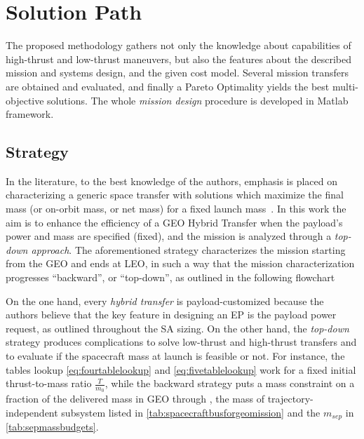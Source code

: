 
\section{Solution Path}
\label{sec:solutionpath}
The proposed methodology gathers not only the knowledge about capabilities of high-thrust and low-thrust maneuvers, but also the features about the described mission and systems design, and the given cost model.
Several mission transfers are obtained and evaluated, and finally a Pareto Optimality yields the best multi-objective solutions.
The whole \emph{mission design} procedure is developed in Matlab framework.
\subsection{Strategy}
\label{subsec:strategy}
In the literature, to the best knowledge of the authors, emphasis is placed on characterizing a generic space transfer with solutions which maximize the final mass (or on-orbit mass, or net mass) for a fixed launch mass~\cite{Randolph:2002aa,Oleson:1997aa}.
In this work the aim is to enhance the efficiency of a GEO Hybrid Transfer when the payload's power and mass are specified (fixed), and the mission is analyzed through a \emph{top-down approach}. 
The aforementioned strategy characterizes the mission starting from the GEO and ends at LEO, in such a way that the mission characterization progresses ``backward'', or ``top-down'', as outlined in the following flowchart
%
\begin{center}
\end{center}
%
On the one hand, every \emph{hybrid transfer} is payload-customized because the authors believe that the key feature in designing an EP is the payload power request, as outlined throughout the SA sizing.
On the other hand, the \emph{top-down} strategy produces complications to solve low-thrust and high-thrust transfers and to evaluate if the spacecraft mass at launch is feasible or not. 
For instance, the tables lookup \eqref{eq:fourtablelookup} and \eqref{eq:fivetablelookup} work for a fixed initial thrust-to-mass ratio $\tfrac{T}{m_0}$, while the backward strategy puts a mass constraint on a fraction of the delivered mass in GEO through , the mass of trajectory-independent subsystem listed in \tablename\ref{tab:spacecraftbusforgeomission} and the $m_{sep}$ in \tablename\ref{tab:sepmassbudgets}.
